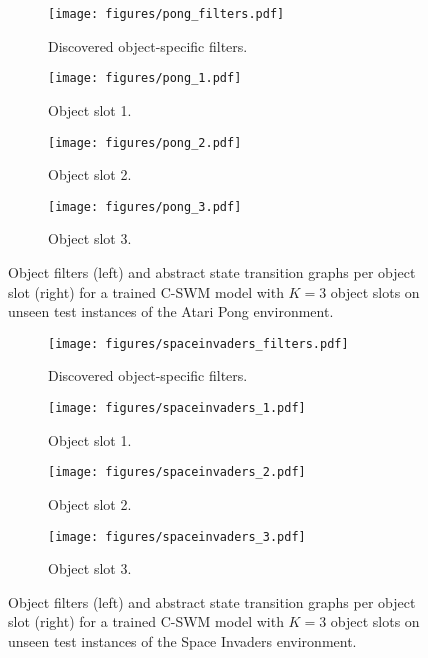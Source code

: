 \documentclass{article} %
\begin{document}
\begin{figure*}[htp]
\centering
  \begin{subfigure}[b]{0.38\textwidth}
  \centering
    \texttt{[image: figures/pong\_filters.pdf]}
    \caption{Discovered object-specific filters.}
  \end{subfigure}
  \begin{subfigure}[b]{0.18\textwidth}
  \centering
    \texttt{[image: figures/pong\_1.pdf]}
    \caption{Object slot 1.}
  \end{subfigure}
  \begin{subfigure}[b]{0.18\textwidth}
  \centering
    \texttt{[image: figures/pong\_2.pdf]}
    \caption{Object slot 2.}
  \end{subfigure}
  \begin{subfigure}[b]{0.18\textwidth}
  \centering
    \texttt{[image: figures/pong\_3.pdf]}
    \caption{Object slot 3.}
  \end{subfigure}
  \caption{Object filters (left) and abstract state transition graphs per object slot (right) for a trained C-SWM model with $K=3$ object slots on unseen test instances of the Atari Pong environment.\label{fig:object_graphs_pong}}
\end{figure*}

\begin{figure*}[htp!]
\centering
  \begin{subfigure}[b]{0.38\textwidth}
  \centering
    \texttt{[image: figures/spaceinvaders\_filters.pdf]}
    \caption{Discovered object-specific filters.}
  \end{subfigure}
  \begin{subfigure}[b]{0.18\textwidth}
  \centering
    \texttt{[image: figures/spaceinvaders\_1.pdf]}
    \caption{Object slot 1.}
  \end{subfigure}
  \begin{subfigure}[b]{0.18\textwidth}
  \centering
    \texttt{[image: figures/spaceinvaders\_2.pdf]}
    \caption{Object slot 2.}
  \end{subfigure}
  \begin{subfigure}[b]{0.18\textwidth}
  \centering
    \texttt{[image: figures/spaceinvaders\_3.pdf]}
    \caption{Object slot 3.}
  \end{subfigure}
  \caption{Object filters (left) and abstract state transition graphs per object slot (right) for a trained C-SWM model with $K=3$ object slots on unseen test instances of the Space Invaders environment.\label{fig:object_graphs_spaceinvaders}}
\end{figure*}
\end{document}
